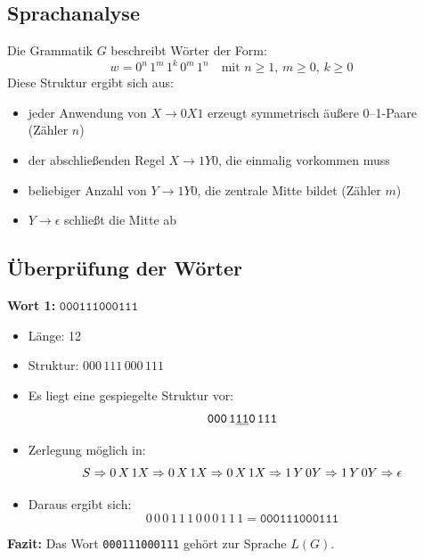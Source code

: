 \documentclass[a4paper,12pt]{article}
\begin{document}
\subsection*{Sprachanalyse}

Die Grammatik \( G \) beschreibt Wörter der Form:
\[
w = 0^n \, 1^m \, 1^k \, 0^m \, 1^n \quad \text{mit } n \geq 1,\, m \geq 0,\, k \geq 0
\]
Diese Struktur ergibt sich aus:
\begin{itemize}
	\item jeder Anwendung von \( X \rightarrow 0 X 1 \) erzeugt symmetrisch äußere 0–1-Paare (Zähler \( n \))
	\item der abschließenden Regel \( X \rightarrow 1 Y 0 \), die einmalig vorkommen muss
	\item beliebiger Anzahl von \( Y \rightarrow 1 Y 0 \), die zentrale Mitte bildet (Zähler \( m \))
	\item \( Y \rightarrow \epsilon \) schließt die Mitte ab
\end{itemize}

\subsection*{Überprüfung der Wörter}

\textbf{Wort 1:} \( \texttt{000111000111} \)

\begin{itemize}
	\item Länge: 12
	\item Struktur: \( 000 \, 111 \, 000 \, 111 \)
	\item Es liegt eine gespiegelte Struktur vor:
	\[ \texttt{000} \, \texttt{1\underline{11}0} \, \texttt{111} \]
	\item Zerlegung möglich in:
	\[
	S \Rightarrow 0\, X\, 1 \\
	X \Rightarrow 0\, X\, 1 \\
	X \Rightarrow 0\, X\, 1 \\
	X \Rightarrow 1\, Y\, 0 \\
	Y \Rightarrow 1\, Y\, 0 \\
	Y \Rightarrow \epsilon
	\]
	\item Daraus ergibt sich:
	\[
	0\,0\,0\,1\,1\,1\,0\,0\,0\,1\,1\,1 = \texttt{000111000111}
	\]
\end{itemize}

\textbf{Fazit:} Das Wort \texttt{000111000111} gehört zur Sprache \( L(G) \).

\vspace{1em}
\end{document}
